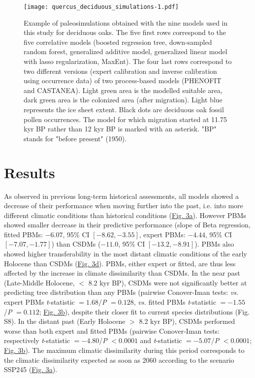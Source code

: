 \documentclass[9pt,twocolumn,twoside]{pnas-new}
\begin{document}
\begin{figure}
\centering
\texttt{[image: quercus\_deciduous\_simulations-1.pdf]}
\caption{Example of paleosimulations obtained with the nine models used in this study for deciduous oaks. The five first rows correspond to the five correlative models (boosted regression tree, down-sampled random forest, generalized additive model, generalized linear model with lasso regularization, MaxEnt). The four last rows correspond to two different versions (expert calibration and inverse calibration using occurrence data) of two process-based models (PHENOFIT and CASTANEA). Light green area is the modelled suitable area, dark green area is the colonized area (after migration). Light blue represents the ice sheet extent. Black dots are deciduous oak fossil pollen occurrences. The model for which migration started at 11.75 kyr BP rather than 12 kyr BP is marked with an asterisk. "BP" stands for "before present" (1950).}
\label{fig:quercusdeciduoussimulations}
\end{figure}

\section*{Results}
As observed in previous long-term historical assessments, all models showed a decrease of their performance when moving further into the past, i.e. into more different climatic conditions than historical conditions (\hyperref[fig:pastperformance]{Fig. 3a}). However PBMs showed smaller decrease in their predictive performance (slope of Beta regression, fitted PBMs: $-6.07$, 95\% CI $[-8.62, -3.55]$, expert PBMs: $-4.44$, 95\% CI $[-7.07, -1.77]$) than CSDMs ($-11.0$, 95\% CI $[-13.2, -8.91]$). PBMs also showed higher transferability in the most distant climatic conditions of the early Holocene than CSDMs (\hyperref[fig:pastperformance]{Fig. 3d}). PBMs, either expert or fitted, are thus less affected by the increase in climate dissimilarity than CSDMs. In the near past (Late-Middle Holocene, $<$ 8.2 kyr BP), CSDMs were not significantly better at predicting tree distribution than any PBMs (pairwise Conover-Iman tests: \emph{vs.} expert PBMs \emph{t}-statistic $=1.68$/\emph{P} $=0.128$, \emph{vs.} fitted PBMs \emph{t}-statistic $=-1.55$/\emph{P} $=0.112$; \hyperref[fig:pastperformance]{Fig. 3b}), despite their closer fit to current species distributions (Fig. S8). In the distant past (Early Holocene $>$ 8.2 kyr BP), CSDMs performed worse than both expert and fitted PBMs (pairwise Conover-Iman tests: respectively \emph{t}-statistic $=-4.80$/\emph{P} $<0.0001$ and \emph{t}-statistic $=-5.07$/\emph{P} $<0.0001$; \hyperref[fig:pastperformance]{Fig. 3b}). The maximum climatic dissimilarity during this period corresponds to the climatic dissimilarity expected as soon as 2060 according to the scenario SSP245 (\hyperref[fig:pastperformance]{Fig. 3a}).
\end{document}
